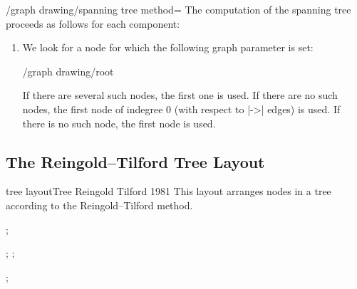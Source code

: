 \begin{key}{/graph drawing/spanning tree method=}
  The computation of the spanning tree proceeds as follows for each component:
  \begin{enumerate}
  \item We look for a node for which the following graph parameter is
    set:
    \begin{key}{/graph drawing/root}
    \end{key}
    If there are several such nodes, the first one is used. If there
    are no such nodes, the first node of indegree 0 (with respect to
    |->| edges) is used. If there is no such node, the first node is
    used. 
  \end{enumerate}
\end{key}




\subsection{The Reingold--Tilford Tree Layout}

\begin{gdalgorithm}{tree layout}{Tree Reingold Tilford 1981}
  This layout arranges nodes in a tree according to the
  Reingold--Tilford method.
\begin{codeexample}[]
\tikz [binary tree layout, sibling distance=7mm, level distance=10mm]
\graph [nodes={circle, inner sep=0pt, minimum size=2mm, fill}]{
  / -- { / -- / -- { / -- /, / -- { /, / }}, / -- / -- /[second] }
};
\end{codeexample}
\begin{codeexample}[]
\tikz {};\qquad
\tikz {};
\end{codeexample}
\begin{codeexample}[]
\tikz {};
\end{codeexample}
\end{gdalgorithm}

